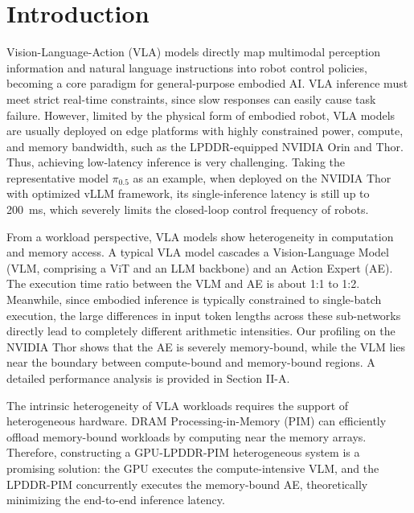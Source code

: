 \section{Introduction}
\label{sec:introduction}

Vision-Language-Action (VLA) models directly map multimodal perception information and natural language instructions into robot control policies, becoming a core paradigm for general-purpose embodied AI. VLA inference must meet strict real-time constraints, since slow responses can easily cause task failure. However, limited by the physical form of embodied robot, VLA models are usually deployed on edge platforms with highly constrained power, compute, and memory bandwidth, such as the LPDDR-equipped NVIDIA Orin and Thor. Thus, achieving low-latency inference is very challenging. Taking the representative model $\pi_{0.5}$ as an example, when deployed on the NVIDIA Thor with optimized vLLM framework, its single-inference latency is still up to \textcolor[HTML]{EE0000}{200~ms,} which severely limits the closed-loop control frequency of robots.

From a workload perspective, VLA models show heterogeneity in computation and memory access. A typical VLA model cascades a Vision-Language Model (VLM, comprising a ViT and an LLM backbone) and an Action Expert (AE). The execution time ratio between the VLM and AE is about 1:1 to 1:2. Meanwhile, since embodied inference is typically constrained to single-batch execution, the large differences in input token lengths across these sub-networks directly lead to completely different arithmetic intensities. Our profiling on the NVIDIA Thor shows that the AE is severely memory-bound, while the VLM lies near the boundary between compute-bound and memory-bound regions. A detailed performance analysis is provided in Section II-A.

The intrinsic heterogeneity of VLA workloads requires the support of heterogeneous hardware. DRAM Processing-in-Memory (PIM) can efficiently offload memory-bound workloads by computing near the memory arrays. Therefore, constructing a GPU-LPDDR-PIM heterogeneous system is a promising solution: the GPU executes the compute-intensive VLM, and the LPDDR-PIM concurrently executes the memory-bound AE, theoretically minimizing the end-to-end inference latency.

